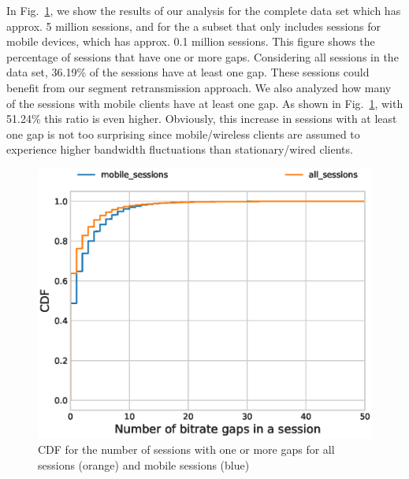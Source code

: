 In Fig.~\ref{fig:gap_cdf}, we show the results of our analysis for the complete data set which has approx. 5 million sessions, and for the a subset that only includes sessions for mobile devices, which has approx. 0.1 million sessions. This figure shows the percentage of sessions that have one or more gaps. Considering all sessions in the data set, 36.19\% of the sessions have at least one gap. These sessions could benefit from our segment retransmission approach. We also analyzed how many of the sessions with mobile clients have at least one gap. As shown in Fig.~\ref{fig:gap_cdf}, with 51.24\% this ratio is even higher. Obviously, this increase in sessions with at least one gap is not too surprising since mobile/wireless clients are assumed to experience higher bandwidth fluctuations than stationary/wired clients.

\begin{figure}
\centering
\includegraphics[width=.9\linewidth] {figures/all_gapCDF.eps}
\caption{CDF for the number of sessions with one or more gaps for all sessions (orange) and mobile sessions (blue)}
\label{fig:gap_cdf}
\vspace{-12pt}
\end{figure}
